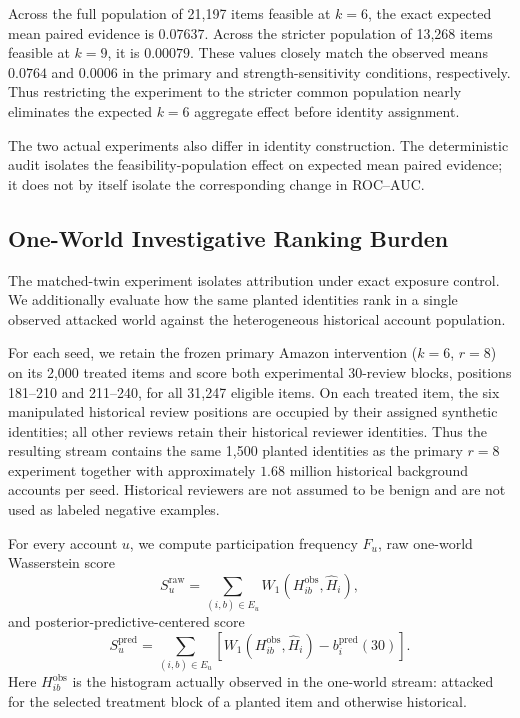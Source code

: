 Across the full population of 21,197 items feasible at $k=6$, the exact
expected mean paired evidence is $0.07637$. Across the stricter population
of 13,268 items feasible at $k=9$, it is $0.00079$. These values closely
match the observed means $0.0764$ and $0.0006$ in the primary and
strength-sensitivity conditions, respectively. Thus restricting the
experiment to the stricter common population nearly eliminates the
expected $k=6$ aggregate effect before identity assignment.

The two actual experiments also differ in identity construction. The deterministic audit
isolates the feasibility-population effect on expected mean paired
evidence; it does not by itself isolate the corresponding change in
ROC--AUC.


\subsection{One-World Investigative Ranking Burden}
\label{sec:supp-one-world-ranking}

The matched-twin experiment isolates attribution under exact exposure control.
We additionally evaluate how the same planted identities rank in a single
observed attacked world against the heterogeneous historical account
population.

For each seed, we retain the frozen primary Amazon intervention
($k=6$, $r=8$) on its 2,000 treated items and score both experimental
30-review blocks, positions 181--210 and 211--240, for all 31,247 eligible
items.  On each treated item, the six manipulated historical review positions
are occupied by their assigned synthetic identities; all other reviews retain
their historical reviewer identities.  Thus the resulting stream contains the
same 1,500 planted identities as the primary $r=8$ experiment together with
approximately $1.68$ million historical background accounts per seed.
Historical reviewers are not assumed to be benign and are not used as labeled
negative examples.

For every account $u$, we compute participation frequency $F_u$, raw one-world
Wasserstein score
\[
S_u^{\mathrm{raw}}
=
\sum_{(i,b)\in E_u}
W_1(H_{ib}^{\mathrm{obs}},\widehat H_i),
\]
and posterior-predictive-centered score
\[
S_u^{\mathrm{pred}}
=
\sum_{(i,b)\in E_u}
\left[
W_1(H_{ib}^{\mathrm{obs}},\widehat H_i)
-
b_i^{\mathrm{pred}}(30)
\right].
\]
Here $H_{ib}^{\mathrm{obs}}$ is the histogram actually observed in the
one-world stream: attacked for the selected treatment block of a planted item
and otherwise historical.


